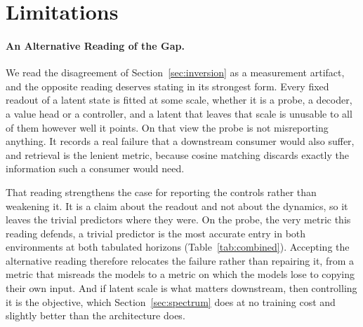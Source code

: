 \documentclass[10pt]{article} %
\begin{document}
\section{Limitations}
\label{sec:limitations}
\paragraph{An Alternative Reading of the Gap.}
We read the disagreement of Section~\ref{sec:inversion} as a measurement artifact, and the opposite reading deserves stating in its strongest form. Every fixed readout of a latent state is fitted at some scale, whether it is a probe, a decoder, a value head or a controller, and a latent that leaves that scale is unusable to all of them however well it points. On that view the probe is not misreporting anything. It records a real failure that a downstream consumer would also suffer, and retrieval is the lenient metric, because cosine matching discards exactly the information such a consumer would need.

That reading strengthens the case for reporting the controls rather than weakening it. It is a claim about the readout and not about the dynamics, so it leaves the trivial predictors where they were. On the probe, the very metric this reading defends, a trivial predictor is the most accurate entry in both environments at both tabulated horizons (Table~\ref{tab:combined}). Accepting the alternative reading therefore relocates the failure rather than repairing it, from a metric that misreads the models to a metric on which the models lose to copying their own input. And if latent scale is what matters downstream, then controlling it is the objective, which Section~\ref{sec:spectrum} does at no training cost and slightly better than the architecture does.

\end{document}
